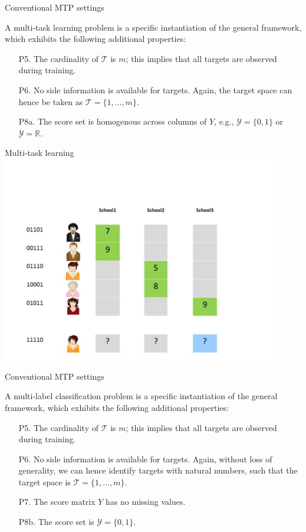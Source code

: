 \documentclass[]{beamer}
\begin{document}
\begin{frame}{Conventional MTP settings}
\begin{definition} 
A multi-task learning problem is a specific instantiation of the general framework, which exhibits the following additional properties: 
\begin{enumerate}
\item[P5.] The cardinality of $\mathcal{T}$ is $m$; this implies that all targets are observed during training. 
\item[P6.] No side information is available for targets. Again, the target space can hence be taken as $\mathcal{T} = \{1,...,m\}$.   
\item[P8a.] The score set is homogenous across columns of $Y$, e.g., $\mathcal{Y} = \{0,1\}$ or $\mathcal{Y} = \mathbb{R}$.
\end{enumerate}
\end{definition}
\end{frame}


\begin{frame}{Multi-task learning}
\includegraphics[width=0.9\textwidth,trim = 0 0 100 100,clip]{Figures/pictures/Slide3}
\end{frame}


\begin{frame}{Conventional MTP settings}
\begin{definition} 
A multi-label classification problem is a specific instantiation of the general framework, which exhibits the following additional properties: 
\begin{enumerate}
\item[P5.] The cardinality of $\mathcal{T}$ is $m$; this implies that all targets are observed during training. 
\item[P6.] No side information is available for targets. Again, without loss of generality, we can hence identify targets with natural numbers, such that the target space is $\mathcal{T} = \{1,...,m\}$. 
\item[P7.] The score matrix $Y$ has no missing values. 
\item[P8b.] The score set is $\mathcal{Y} = \{0,1\}$. 
\end{enumerate}
\end{definition}
\end{frame}
\end{document}
